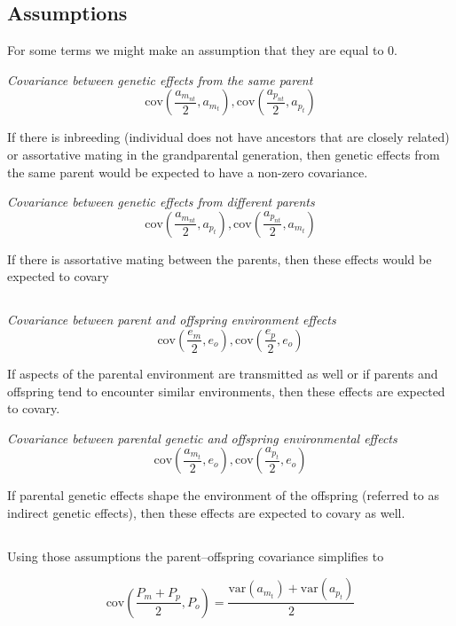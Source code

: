 \documentclass[
  letterpaper,
  DIV=11,
  numbers=noendperiod]{scrartcl}
\begin{document}
\subsection{Assumptions}\label{assumptions}

For some terms we might make an assumption that they are equal to 0.

\emph{Covariance between genetic effects from the same parent} \[
\mathrm{cov}(\frac{a_{m_{nt}}}{2}, a_{m_{t}}), \mathrm{cov}(\frac{a_{p_{nt}}}{2}, a_{p_t})
\]

If there is inbreeding (individual does not have ancestors that are
closely related) or assortative mating in the grandparental generation,
then genetic effects from the same parent would be expected to have a
non-zero covariance.

\emph{Covariance between genetic effects from different parents} \[
\mathrm{cov}(\frac{a_{m_{nt}}}{2}, a_{p_t}), \mathrm{cov}(\frac{a_{p_{nt}}}{2}, a_{m_{t}})
\]

If there is assortative mating between the parents, then these effects
would be expected to covary

\subsection{}\label{section-13}

\emph{Covariance between parent and offspring environment effects} \[
\mathrm{cov}(\frac{e_m}{2}, e_o), \mathrm{cov}(\frac{e_p}{2}, e_o)
\]

If aspects of the parental environment are transmitted as well or if
parents and offspring tend to encounter similar environments, then these
effects are expected to covary.

\emph{Covariance between parental genetic and offspring environmental
effects} \[
\mathrm{cov}(\frac{a_{m_{t}}}{2}, e_o), \mathrm{cov}(\frac{a_{p_t}}{2}, e_o)
\]

If parental genetic effects shape the environment of the offspring
(referred to as indirect genetic effects), then these effects are
expected to covary as well.

\subsection{}\label{section-14}

Using those assumptions the parent--offspring covariance simplifies to

\[
\mathrm{cov}(\frac{P_m + P_p}{2}, P_o) = \frac{\mathrm{var}(a_{m_{t}}) + \mathrm{var}(a_{p_t})}{2}
\]
\end{document}
